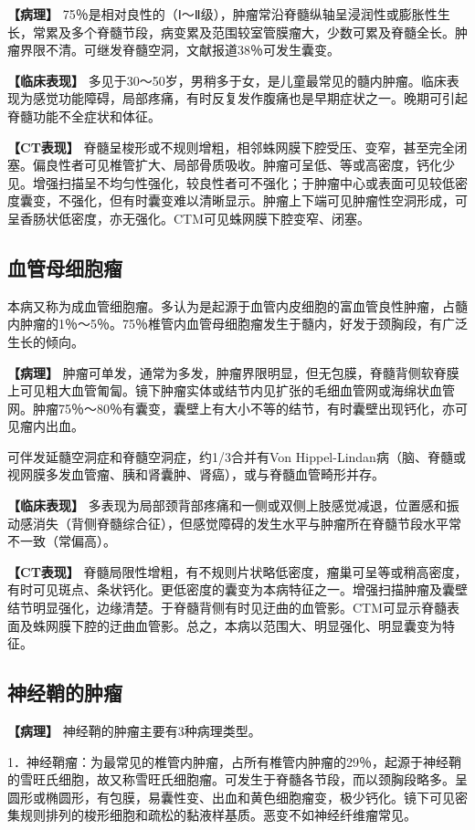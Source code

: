 \textbf{【病理】}
75％是相对良性的（Ⅰ～Ⅱ级），肿瘤常沿脊髓纵轴呈浸润性或膨胀性生长，常累及多个脊髓节段，病变累及范围较室管膜瘤大，少数可累及脊髓全长。肿瘤界限不清。可继发脊髓空洞，文献报道38％可发生囊变。

\textbf{【临床表现】}
多见于30～50岁，男稍多于女，是儿童最常见的髓内肿瘤。临床表现为感觉功能障碍，局部疼痛，有时反复发作腹痛也是早期症状之一。晚期可引起脊髓功能不全症状和体征。

\textbf{【CT表现】}
脊髓呈梭形或不规则增粗，相邻蛛网膜下腔受压、变窄，甚至完全闭塞。偏良性者可见椎管扩大、局部骨质吸收。肿瘤可呈低、等或高密度，钙化少见。增强扫描呈不均匀性强化，较良性者可不强化；于肿瘤中心或表面可见较低密度囊变，不强化，但有时囊变难以清晰显示。肿瘤上下端可见肿瘤性空洞形成，可呈香肠状低密度，亦无强化。CTM可见蛛网膜下腔变窄、闭塞。

\subsection{血管母细胞瘤}

本病又称为成血管细胞瘤。多认为是起源于血管内皮细胞的富血管良性肿瘤，占髓内肿瘤的1％～5％。75％椎管内血管母细胞瘤发生于髓内，好发于颈胸段，有广泛生长的倾向。

\textbf{【病理】}
肿瘤可单发，通常为多发，肿瘤界限明显，但无包膜，脊髓背侧软脊膜上可见粗大血管匍匐。镜下肿瘤实体或结节内见扩张的毛细血管网或海绵状血管网。肿瘤75％～80％有囊变，囊壁上有大小不等的结节，有时囊壁出现钙化，亦可见瘤内出血。

可伴发延髓空洞症和脊髓空洞症，约1/3合并有Von
Hippel-Lindan病（脑、脊髓或视网膜多发血管瘤、胰和肾囊肿、肾癌），或与脊髓血管畸形并存。

\textbf{【临床表现】}
多表现为局部颈背部疼痛和一侧或双侧上肢感觉减退，位置感和振动感消失（背侧脊髓综合征），但感觉障碍的发生水平与肿瘤所在脊髓节段水平常不一致（常偏高）。

\textbf{【CT表现】}
脊髓局限性增粗，有不规则片状略低密度，瘤巢可呈等或稍高密度，有时可见斑点、条状钙化。更低密度的囊变为本病特征之一。增强扫描肿瘤及囊壁结节明显强化，边缘清楚。于脊髓背侧有时见迂曲的血管影。CTM可显示脊髓表面及蛛网膜下腔的迂曲血管影。总之，本病以范围大、明显强化、明显囊变为特征。

\subsection{神经鞘的肿瘤}

\textbf{【病理】} 神经鞘的肿瘤主要有3种病理类型。

1．神经鞘瘤：为最常见的椎管内肿瘤，占所有椎管内肿瘤的29％，起源于神经鞘的雪旺氏细胞，故又称雪旺氏细胞瘤。可发生于脊髓各节段，而以颈胸段略多。呈圆形或椭圆形，有包膜，易囊性变、出血和黄色细胞瘤变，极少钙化。镜下可见密集规则排列的梭形细胞和疏松的黏液样基质。恶变不如神经纤维瘤常见。

